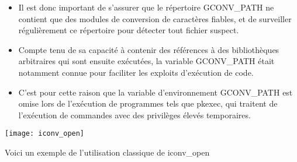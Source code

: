 \documentclass[12pt,a4paper]{article}
\begin{document}
\begin{flushleft}
\begin{itemize}
                    \item Il est donc important de s'assurer que le répertoire GCONV\_PATH ne contient que des modules de conversion de caractères fiables, et de surveiller régulièrement ce répertoire pour détecter tout fichier suspect.
                    \item Compte tenu de sa capacité à contenir des références à des bibliothèques arbitraires qui sont ensuite exécutées, la variable GCONV\_PATH était notamment connue pour faciliter les exploits d’exécution de code. 
                    \item C’est pour cette raison que la variable d’environnement GCONV\_PATH est omise lors de l’exécution de programmes tels que pkexec, qui traitent de l’exécution de commandes avec des privilèges élevés temporaires.
                \end{itemize}

                \begin{center}
                    \texttt{[image: iconv\_open]}
                \end{center}

                \item Voici un exemple de l'utilisation classique de iconv\_open
                \begin{center}
   		  
                \end{center}
                
                \cite{iconvman:online}
                \cite{gconvpath:online}

                \newpage

\end{flushleft}
\end{document}
